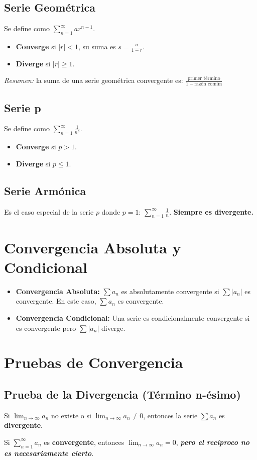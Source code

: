 \documentclass[a4paper,12pt]{article}
\begin{document}
\subsection{Serie Geométrica}
Se define como $\sum_{n=1}^{\infty} ar^{n-1}$. 
\begin{itemize}
    \item \textbf{Converge} si $|r| < 1$, su suma es $s = \frac{a}{1-r}$.
    \item \textbf{Diverge} si $|r| \geqslant 1$.
\end{itemize}
\textit{Resumen:} la suma de una serie geométrica convergente es: $\frac{\text{primer término}}{1 - \text{razón común}}$

\subsection{Serie p}
Se define como $\sum_{n=1}^{\infty} \frac{1}{n^p}$.
\begin{itemize}
    \item \textbf{Converge} si $p > 1$.
    \item \textbf{Diverge} si $p \leqslant 1$.
\end{itemize}

\subsection{Serie Armónica}
Es el caso especial de la serie $p$ donde $p=1$: $\sum_{n=1}^{\infty} \frac{1}{n}$.
\textbf{Siempre es divergente.}

\section{Convergencia Absoluta y Condicional}
\begin{itemize}
    \item \textbf{Convergencia Absoluta:} $\sum a_n$ es absolutamente convergente si $\sum |a_n|$ es convergente. En este caso, $\sum a_n$ es convergente.
    \item \textbf{Convergencia Condicional:} Una serie es condicionalmente convergente si es convergente pero $\sum |a_n|$ diverge.
\end{itemize}

\section{Pruebas de Convergencia}

\subsection{Prueba de la Divergencia (Término n-ésimo)}
Si $\lim_{n \to \infty} a_n$ no existe o si $\lim_{n \to \infty} a_n \neq 0$, entonces la serie $\sum a_n$ es \textbf{divergente}.
\begin{tcolorbox}
    Si $\sum_{n=1}^{\infty} a_n$ es \textbf{convergente}, entonces $\lim_{n \to \infty} a_n = 0$, \textit{\textbf{pero el recíproco no es necesariamente cierto}}.
\end{tcolorbox}
\end{document}
